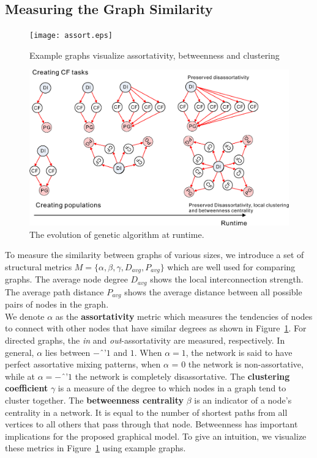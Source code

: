 \subsection{Measuring the Graph Similarity}
\begin{figure}%
  \centering
  \texttt{[image: assort.eps]}
  \vskip -2mm
  \caption{Example graphs visualize assortativity, betweenness and clustering }
  \label{fig:assort}
  \vskip -3mm
\end{figure}
\begin{figure}[t]
  \centering
  \includegraphics[width=1\columnwidth]{evl.eps}
  \vskip -2mm
  \caption{The evolution of genetic algorithm at runtime.}
  \label{fig:fig_evl}
  \vskip -5mm
\end{figure}
To measure the similarity between graphs of various sizes, we introduce a set of structural metrics $M=\{\alpha, \beta, \gamma, D_{avg}, P_{avg}\}$ which are well used for comparing graphs. The average node degree $D_{avg}$ shows the local interconnection strength. The average path distance $P_{avg}$ shows the average distance between all possible pairs of nodes in the graph.\\
\indent We denote $\alpha$ as the \textbf{assortativity} metric which measures the tendencies of nodes to connect with other nodes that have similar degrees as shown in Figure~\ref{fig:assort}. For directed graphs, the \textit{in} and \textit{out}-assortativity are measured, respectively. In general, $\alpha$ lies between $-1$ and $1$. When $\alpha = 1$, the network is said to have perfect assortative mixing patterns, when $\alpha$ = 0 the network is non-assortative, while at $\alpha = -1$ the network is completely disassortative. The \textbf{clustering coefficient} $\gamma$ is a measure of the degree to which nodes in a graph tend to cluster together. The \textbf{betweenness centrality} $\beta$ is an indicator of a node's centrality in a network. It is equal to the number of shortest paths from all vertices to all others that pass through that node. Betweenness has important implications for the proposed graphical model. To give an intuition, we visualize these metrics in Figure~\ref{fig:assort} using example graphs.\\
